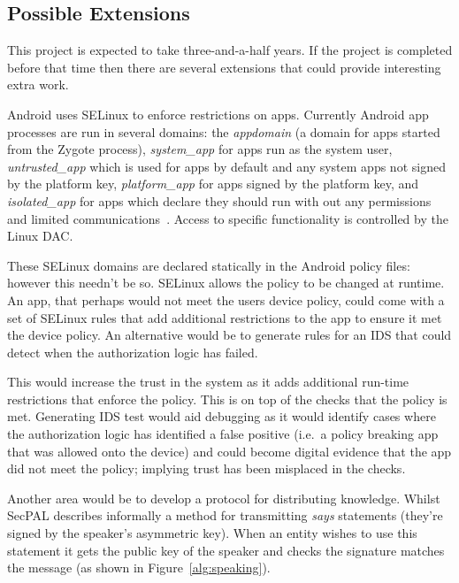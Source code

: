 \documentclass[a4paper]{article}
\begin{document}
\subsection{Possible Extensions}

This project is expected to take three-and-a-half years. If the project is
completed before that time then there are several extensions that could provide
interesting extra work.

Android uses SELinux to enforce restrictions on apps.  Currently Android app
processes are run in several domains: the \emph{appdomain} (a domain for apps
started from the Zygote process), \emph{system\_app} for apps run as the system
user, \emph{untrusted\_app} which is used for apps by default and any system
apps not signed by the platform key, \emph{platform\_app} for apps signed by the
platform key, and \emph{isolated\_app} for apps which declare they should run
with out any permissions and limited communications~\cite{google:sepolicy}.
Access to specific functionality is controlled by the Linux \ac{DAC}.

These SELinux domains are declared statically in the Android policy files:
however this needn't be so.  SELinux allows the policy to be changed at runtime.
An app, that perhaps would not meet the users device policy, could come with a
set of SELinux rules that add additional restrictions to the app to ensure it
met the device policy.  An alternative would be to generate rules for an
\ac{IDS} that could detect when the authorization logic has failed.

This would increase the trust in the system as it adds additional run-time
restrictions that enforce the policy.  This is on top of the checks that the policy is
met.  Generating \ac{IDS} test would aid debugging as it would identify cases
where the authorization logic has identified a false positive (i.e.~a policy
breaking app that was allowed onto the device) and could become digital evidence
that the app did not meet the policy; implying trust has been misplaced in the
checks.

Another area would be to develop a protocol for distributing knowledge.  
Whilst SecPAL describes informally a method for transmitting \emph{says}
statements (they're signed by the speaker's asymmetric key).  When an entity
wishes to use this statement it gets the public key of the speaker and checks
the signature matches the message (as shown in Figure~\ref{alg:speaking}).  
\end{document}
